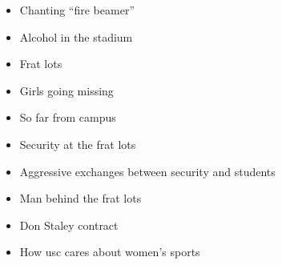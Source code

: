 \documentclass{article}
\begin{document}
\begin{itemize}
  \begin{itemize}
  \item
    ROTC kids clean it up
  \end{itemize}
\item
  Chanting ``fire beamer''~
\item
  Alcohol in the stadium~
\item
  Frat lots~
\item
  Girls going missing
\item
  So far from campus
\item
  Security at the frat lots
\item
  Aggressive exchanges between security and students
\item
  Man behind the frat lots~
\item
  Don Staley contract
\item
  How usc cares about women's sports
\end{itemize}
\end{document}
